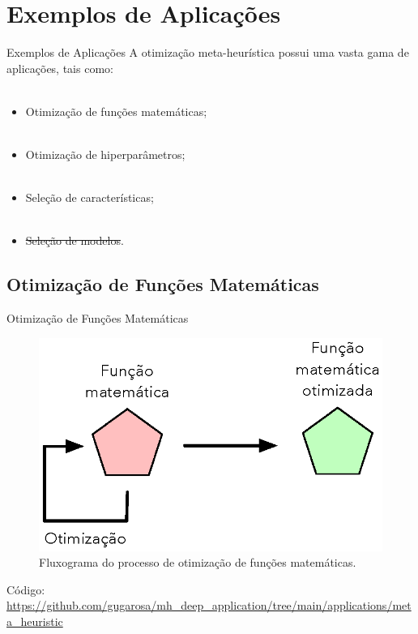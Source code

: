 \section{Exemplos de Aplicações}
\label{s.applications}

\begin{frame}{Exemplos de Aplicações}
	A otimização meta-heurística possui uma vasta gama de aplicações, tais como:
	\\~\\
	\begin{itemize}
		\justifying
		\item Otimização de funções matemáticas;
		\\~\\
		\item Otimização de hiperparâmetros;
		\\~\\
		\item Seleção de características;
		\\~\\
		\item \sout{Seleção de modelos}.
	\end{itemize}

\end{frame}

\subsection{Otimização de Funções Matemáticas}
\label{ss.applications_benchmark}

\begin{frame}{Otimização de Funções Matemáticas}
	\begin{figure}
		\centering
		\includegraphics[scale=0.6]{figs/benchmark_opt.eps}	
		\caption{Fluxograma do processo de otimização de funções matemáticas.}
		\label{f.benchmark_opt}
	\end{figure}
	Código: \url{https://github.com/gugarosa/mh_deep_application/tree/main/applications/meta_heuristic}
\end{frame}

